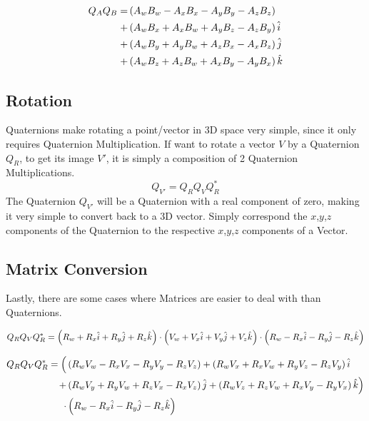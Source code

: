 \begin{align*}
Q_AQ_B = 
& \left(A_wB_w - A_xB_x - A_yB_y - A_zB_z\right)\\+
& \left(A_wB_x + A_xB_w + A_yB_z - A_zB_y\right)\hat{\textcolor{black}{i}}\\+
& \left(A_wB_y + A_yB_w + A_zB_x - A_xB_z\right)\hat{\textcolor{black}{j}}\\+
& \left(A_wB_z + A_zB_w + A_xB_y - A_yB_x\right)\hat{\textcolor{black}{k}}\\
\end{align*}
\subsection{Rotation}
Quaternions make rotating a point/vector in 3D space very simple, since it only requires Quaternion Multiplication. If want to rotate a vector $V$ by a Quaternion $Q_R$, to get its image $V'$, it is simply a composition of 2 Quaternion Multiplications.
$$Q_{V'} = Q_RQ_VQ_R^*$$
The Quaternion $Q_{V'}$ will be a Quaternion with a real component of zero, making it very simple to convert back to a 3D vector. Simply correspond the $x$,$y$,$z$ components of the Quaternion to the respective $x$,$y$,$z$ components of a Vector.

\subsection{Matrix Conversion}
Lastly, there are some cases where Matrices are easier to deal with than Quaternions.  

$$Q_RQ_VQ_R^* = \left(R_w + R_x\hat{\textcolor{black}{i}} + R_y\hat{\textcolor{black}{j}} + R_z\hat{\textcolor{black}{k}}\right)\cdot\left(V_w + V_x\hat{\textcolor{black}{i}} + V_y\hat{\textcolor{black}{j}} + V_z\hat{\textcolor{black}{k}}\right)\cdot\left(R_w - R_x\hat{\textcolor{black}{i}} - R_y\hat{\textcolor{black}{j}} - R_z\hat{\textcolor{black}{k}}\right)$$

\begin{align*}
Q_RQ_VQ_R^* = 
\Big( 
	& \left(R_wV_w - R_xV_x - R_yV_y - R_zV_z\right)+
	  \left(R_wV_x + R_xV_w + R_yV_z - R_zV_y\right)\hat{\textcolor{black}{i}}\\+
	& \left(R_wV_y + R_yV_w + R_zV_x - R_xV_z\right)\hat{\textcolor{black}{j}}+
	  \left(R_wV_z + R_zV_w + R_xV_y - R_yV_x\right)\hat{\textcolor{black}{k}}\Big)\\\cdot 
	& \left(R_w - R_x\hat{\textcolor{black}{i}} - R_y\hat{\textcolor{black}{j}} - R_z\hat{\textcolor{black}{k}}\right)
\end{align*}


